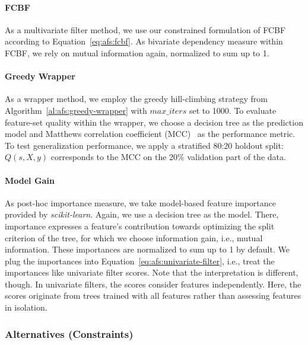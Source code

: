 \documentclass{article}
\theoremstyle{definition}
\begin{document}
\paragraph{FCBF}

As a multivariate filter method, we use our constrained formulation of FCBF~\cite{yu2003feature} according to Equation~\ref{eq:afs:fcbf}.
As bivariate dependency measure within FCBF, we rely on mutual information again, normalized to sum up to 1.

\paragraph{Greedy Wrapper}

As a wrapper method, we employ the greedy hill-climbing strategy from Algorithm~\ref{al:afs:greedy-wrapper} with $max\_iters$ set to 1000.
To evaluate feature-set quality within the wrapper, we choose a decision tree as the prediction model and Matthews correlation coefficient (MCC)~\cite{matthews1975comparison} as the performance metric.
To test generalization performance, we apply a stratified 80:20 holdout split:
$Q(s,X,y)$ corresponds to the MCC on the 20\% validation part of the data.

\paragraph{Model Gain}

As post-hoc importance measure, we take model-based feature importance provided by \emph{scikit-learn}.
Again, we use a decision tree as the model.
There, importance expresses a feature's contribution towards optimizing the split criterion of the tree, for which we choose information gain, i.e., mutual information.
These importances are normalized to sum up to 1 by default.
We plug the importances into Equation~\ref{eq:afs:univariate-filter}, i.e., treat the importances like univariate filter scores.
Note that the interpretation is different, though.
In univariate filters, the scores consider features independently.
Here, the scores originate from trees trained with all features rather than assessing features in isolation.

\subsubsection{Alternatives (Constraints)}
\label{sec:afs:experimental-design:approaches:alternatives}
\end{document}
